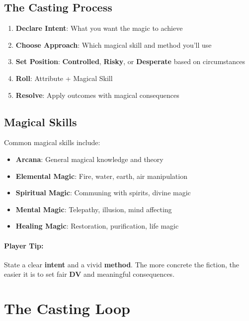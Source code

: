 \subsection*{The Casting Process}
\begin{enumerate}
\item \textbf{Declare Intent}: What you want the magic to achieve
\item \textbf{Choose Approach}: Which magical skill and method you'll use
\item \textbf{Set Position}: \textbf{Controlled}, \textbf{Risky}, or \textbf{Desperate} based on circumstances
\item \textbf{Roll}: Attribute + Magical Skill
\item \textbf{Resolve}: Apply outcomes with magical consequences
\end{enumerate}

\subsection*{Magical Skills}
Common magical skills include:
\begin{itemize}
\item \textbf{Arcana}: General magical knowledge and theory
\item \textbf{Elemental Magic}: Fire, water, earth, air manipulation
\item \textbf{Spiritual Magic}: Communing with spirits, divine magic
\item \textbf{Mental Magic}: Telepathy, illusion, mind affecting
\item \textbf{Healing Magic}: Restoration, purification, life magic
\end{itemize}

\paragraph{Player Tip:}
State a clear \textbf{intent} and a vivid \textbf{method}. The more concrete the fiction, the easier it is to set fair \textbf{DV} and meaningful consequences.

\section{The Casting Loop} 

